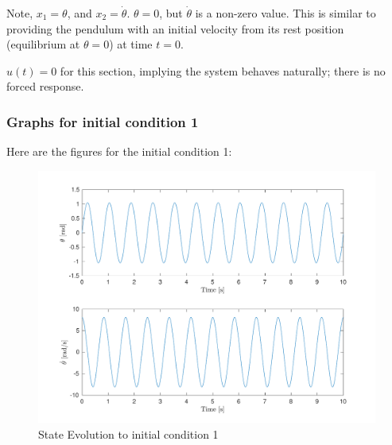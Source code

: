 \documentclass[10pt]{article}
\begin{document}
Note, $x_1 = \theta$, and $x_2 = \dot{\theta}$. 
$\theta = 0$, but $\dot{\theta}$ is a non-zero value. This is similar to providing the pendulum with an initial velocity from its rest position (equilibrium at $\theta = 0$) at time $t = 0$.

$u(t) = 0$ for this section, implying the system behaves naturally; there is no forced response.

\subsubsection{Graphs for initial condition 1}
Here are the figures for the initial condition 1:
    
    \begin{figure}[ht]
     \centering
     \includegraphics[scale=0.7]{lab1/figs/section3_x0_1_state_evolution.pdf}
     \caption{State Evolution to initial condition 1}
     \label{figure:x_0_1_state_evolution}
    \end{figure}
\end{document}

